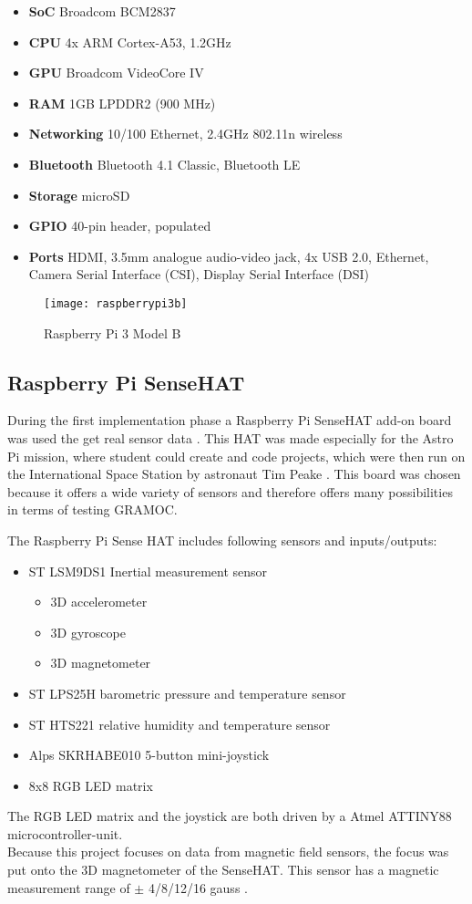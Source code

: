 \begin{itemize}
	\item \textbf{SoC} Broadcom BCM2837
	\item \textbf{CPU} 4x ARM Cortex-A53, 1.2GHz
	\item \textbf{GPU} Broadcom VideoCore IV
	\item \textbf{RAM} 1GB LPDDR2 (900 MHz)
	\item \textbf{Networking} 10/100 Ethernet, 2.4GHz 802.11n wireless
	\item \textbf{Bluetooth} Bluetooth 4.1 Classic, Bluetooth LE
	\item \textbf{Storage} microSD
	\item \textbf{GPIO} 40-pin header, populated
	\item \textbf{Ports} HDMI, 3.5mm analogue audio-video jack, 4x USB 2.0, Ethernet, Camera Serial Interface (CSI), Display Serial Interface (DSI)
\end{itemize}

\begin{figure}[H]
	\centering
	\texttt{[image: raspberrypi3b]}
	\caption{Raspberry Pi 3 Model B}
	\label{fig:raspberrypi3b}
\end{figure}

\subsection{Raspberry Pi SenseHAT}
During the first implementation phase a Raspberry Pi SenseHAT add-on board was used the get real sensor data \cite{SenseHAT}. This HAT was made especially for the Astro Pi mission, where student could create and code projects, which were then run on the International Space Station by astronaut Tim Peake \cite{AstroPiMission}. This board was chosen because it offers a wide variety of sensors and therefore offers many possibilities in terms of testing GRAMOC.

The Raspberry Pi Sense HAT includes following sensors and inputs/outputs:

\begin{itemize}
	\item ST LSM9DS1 Inertial measurement sensor
		\begin{itemize}
			\item 3D accelerometer
			\item 3D gyroscope
			\item 3D magnetometer
		\end{itemize}
	\item ST LPS25H barometric pressure and temperature sensor
	\item ST HTS221 relative humidity and temperature sensor
	\item Alps SKRHABE010 5-button mini-joystick
	\item 8x8 RGB LED matrix
\end{itemize}
\bigskip
The RGB LED matrix and the joystick are both driven by a Atmel ATTINY88 microcontroller-unit.\\
Because this project focuses on data from magnetic field sensors, the focus was put onto the 3D magnetometer of the SenseHAT. This sensor has a magnetic measurement range of $\pm$ 4/8/12/16 gauss \cite{InertialSensorsManual}.

